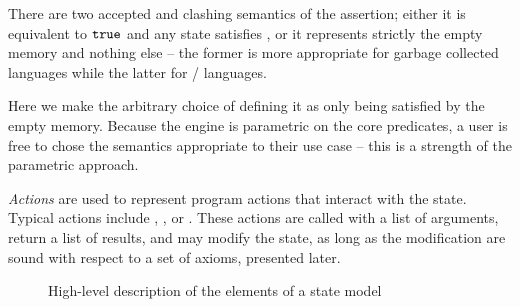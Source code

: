 \begin{remark}
There are two accepted and clashing semantics of the \emp{} assertion; either it is equivalent to $\texttt{true}$ and any state satisfies \emp{}, or it represents strictly the empty memory and nothing else -- the former is more appropriate for garbage collected languages while the latter for \alloc/\free{} languages. \cite{sljungle}

Here we make the arbitrary choice of defining it as only being satisfied by the empty memory. Because the engine is parametric on the core predicates, a user is free to chose the semantics appropriate to their use case -- this is a strength of the parametric approach.
\end{remark}

\emph{Actions} are used to represent program actions that interact with the state. Typical actions include \load{}, \store{}, \alloc{} or \free. These actions are called with a list of arguments, return a list of results, and may modify the state, as long as the modification are sound with respect to a set of axioms, presented later.

\begin{figure}\centering
\setlength{\fboxsep}{0.3cm}
\noindent{}%
\vspace{0.2cm}
\caption{High-level description of the elements of a state model}
\label{fig:state-model-elements}
\end{figure}

